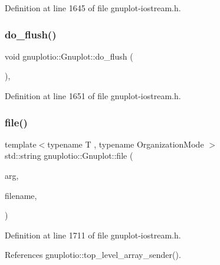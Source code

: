 Definition at line 1645 of file gnuplot-\/iostream.\+h.

\mbox{\label{classgnuplotio_1_1_gnuplot_a0fe1681b2ae4a372b683de488e340faa}} 
\subsubsection{\texorpdfstring{do\+\_\+flush()}{do\_flush()}}
{\footnotesize\ttfamily void gnuplotio\+::\+Gnuplot\+::do\+\_\+flush (\begin{DoxyParamCaption}{ }\end{DoxyParamCaption})\hspace{0.3cm}{\ttfamily [inline]}, {\ttfamily [private]}}



Definition at line 1651 of file gnuplot-\/iostream.\+h.

\mbox{\label{classgnuplotio_1_1_gnuplot_a9b9980e3b3d7cbb233a989e27468fa55}} 
\subsubsection{\texorpdfstring{file()}{file()}}
{\footnotesize\ttfamily template$<$typename T , typename Organization\+Mode $>$ \\
std\+::string gnuplotio\+::\+Gnuplot\+::file (\begin{DoxyParamCaption}\item[{const T \&}]{arg,  }\item[{std\+::string}]{filename,  }\item[{Organization\+Mode}]{ }\end{DoxyParamCaption})\hspace{0.3cm}{\ttfamily [inline]}}



Definition at line 1711 of file gnuplot-\/iostream.\+h.



References gnuplotio\+::top\+\_\+level\+\_\+array\+\_\+sender().

